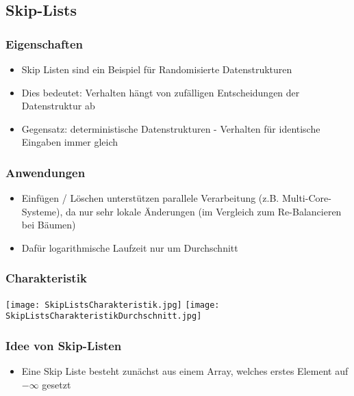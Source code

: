 	\newpage
	\subsection{Skip-Lists}
		\begin{minipage}[t]{0.55\textwidth}
			\subsubsection{Eigenschaften}
				\begin{itemize}
					\item Skip Listen sind ein Beispiel für Randomisierte Datenstrukturen
					\item Dies bedeutet: Verhalten hängt von zufälligen Entscheidungen
						der Datenstruktur ab
					\item Gegensatz: deterministische Datenstrukturen - Verhalten für 
						identische Eingaben immer gleich \\
				\end{itemize}

			\subsubsection{Anwendungen}
				\begin{itemize}
					\item Einfügen / Löschen unterstützen parallele Verarbeitung (z.B. Multi-Core-Systeme),
						da nur sehr lokale Änderungen (im Vergleich zum Re-Balancieren bei Bäumen)
					\item Dafür logarithmische Laufzeit nur um Durchschnitt
				\end{itemize}
		\end{minipage}
		\hspace{1cm}
		\begin{minipage}[t]{0.4\textwidth}
			\begin{center}
				\subsubsection{Charakteristik}
					\texttt{[image: SkipListsCharakteristik.jpg]}
					\texttt{[image: SkipListsCharakteristikDurchschnitt.jpg]}
			\end{center}
		\end{minipage}


		\subsubsection{Idee von Skip-Listen}
			\begin{itemize}
				\item Eine Skip Liste besteht zunächst aus einem Array, welches erstes Element auf $-\infty$
					gesetzt
			\end{itemize}

